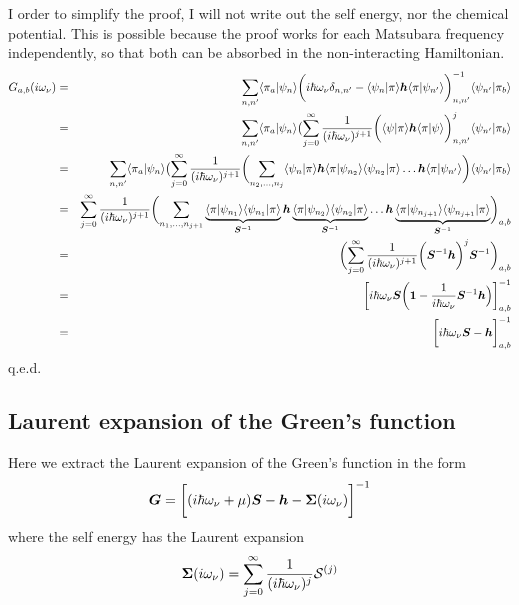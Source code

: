 \documentclass[11pt,a4paper]{report}
\begin{document}
I order to simplify the proof, I will not write out the self energy,
nor the chemical potential. This is possible because the proof works
for each Matsubara frequency independently, so that both can be
absorbed in the non-interacting Hamiltonian.
\begin{eqnarray}
G_{a,b}(i\omega_\nu)
&=&
\sum_{n,n'}\langle\pi_a|\psi_{n}\rangle
\biggl(i\hbar\omega_\nu\delta_{n,n'}
-
\langle\psi_n|\pi\rangle
\bm{h}
\langle\pi|\psi_{n'}\rangle\biggr)^{-1}_{n,n'}
\langle\psi_{n'}|\pi_b\rangle
\nonumber\\
&=&
\sum_{n,n'}\langle\pi_a|\psi_{n}\rangle
\bigl(
\sum_{j=0}^\infty
\frac{1}{(i\hbar\omega_\nu)^{j+1}}
\biggl(
\langle\psi|\pi\rangle
\bm{h}
\langle\pi|\psi\rangle\biggr)^j_{n,n'}
\langle\psi_{n'}|\pi_b\rangle
\nonumber\\
&=&
\sum_{n,n'}\langle\pi_a|\psi_{n}\rangle
\bigl(
\sum_{j=0}^\infty
\frac{1}{(i\hbar\omega_\nu)^{j+1}}
\biggl(\sum_{n_2,\ldots,n_{j}} 
\langle\psi_{n}|\pi\rangle
\bm{h}
\langle\pi|\psi_{n_2}\rangle\langle\psi_{n_2}|\pi\rangle
\ldots
\bm{h}
\langle\pi|\psi_{n'}\rangle\biggr)
\langle\psi_{n'}|\pi_b\rangle
\nonumber\\
&=&
\sum_{j=0}^\infty\frac{1}{(i\hbar\omega_\nu)^{j+1}}
\biggl(\sum_{n_1,\ldots,n_{j+1}} 
\underbrace{\langle\pi|\psi_{n_1}\rangle
\langle\psi_{n_1}|\pi\rangle}_{\bm{S}^{-1}}
\bm{h}
\underbrace{\langle\pi|\psi_{n_2}\rangle\langle\psi_{n_2}|\pi\rangle}_{\bm{S}^{-1}}
\ldots
\bm{h}
\underbrace{\langle\pi|\psi_{n_{j+1}}\rangle
\langle\psi_{n_{j+1}}|\pi\rangle}_{\bm{S}^{-1}}
\biggr)_{a,b}
\nonumber\\
&=&
\biggl(\sum_{j=0}^\infty\frac{1}{(i\hbar\omega_\nu)^{j+1}}
\biggl(\bm{S}^{-1}\bm{h}\biggr)^{j}\bm{S}^{-1}\biggr)_{a,b}
\nonumber\\
&=&\biggl[i\hbar\omega_\nu\bm{S}\biggl
(\bm{1}-\frac{1}{i\hbar\omega_\nu}\bm{S}^{-1}\bm{h}\Bigr)\biggr]^{-1}_{a,b}
\nonumber\\
&=&\biggl[i\hbar\omega_\nu\bm{S}-\bm{h}\biggr]^{-1}_{a,b}
\end{eqnarray}
q.e.d.

\subsection{Laurent expansion of the Green's function}
Here we extract the Laurent expansion of the Green's function in the form
\begin{eqnarray}
\bm{G}=\biggl[(i\hbar\omega_\nu+\mu)\bm{S}
-\bm{h}-\bm{\Sigma}(i\omega_\nu)\biggr]^{-1}
\end{eqnarray}
where the self energy has the Laurent expansion
\begin{eqnarray}
\bm{\Sigma}(i\omega_\nu)
=\sum_{j=0}^\infty\frac{1}{(i\hbar\omega_\nu)^j}\mathcal{S}^{(j)}
\end{eqnarray}
\end{document}
